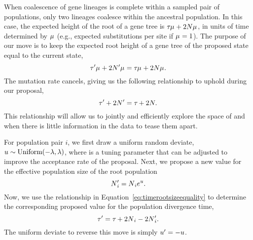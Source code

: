 \begin{linenomath}
When coalescence of gene lineages is complete within a sampled pair of
populations, only two lineages coalesce within the ancestral population.
In this case, the expected height of the root of a gene tree is
$\divtime\murate + 2\sepopsize[\rootpopindex]\murate$,
in units of time determined by $\murate$ (e.g., expected substitutions per site
if $\murate = 1$).
The purpose of our move is to keep the expected root height of a gene tree
of the proposed state equal to the current state,
\begin{equation}
    \divtime\proposed\murate + 2\sepopsize[\rootpopindex]{}\proposed\murate =
    \divtime\murate + 2\sepopsize[\rootpopindex]\murate.
\end{equation}
The mutation rate cancels, giving us the following relationship to uphold
during our proposal,
\begin{equation}
    \divtime\proposed + 2\sepopsize[\rootpopindex]{}\proposed =
    \divtime + 2\sepopsize[\rootpopindex].
    \label{eq:timerootsizeequality}
\end{equation}
This relationship will allow us to jointly and efficiently explore the space of
\divtime and \sepopsize[\rootpopindex] when there is little information in the
data to tease them apart.
\end{linenomath}

\begin{linenomath}
For population pair $i$, we first draw a uniform random deviate,
$\uniformdeviate \sim \textrm{Uniform}(-\tuningparameter, \tuningparameter)$,
where \tuningparameter is a tuning parameter that can be adjusted to 
improve the acceptance rate of the proposal.
Next, we propose a new value for the effective population size of the
root population
\[
    \sepopsize[\rootpopindex]{}_i\proposed = \sepopsize[\rootpopindex]{}_ie^{\uniformdeviate}.
\]
Now, we use the relationship in Equation~\ref{eq:timerootsizeequality} to
determine the corresponding proposed value for the population divergence time,
\begin{equation}
    \divtime\proposed =
    \divtime + 2\sepopsize[\rootpopindex]{}_i - 2\sepopsize[\rootpopindex]{}_i\proposed.
\end{equation}
The uniform deviate to reverse this move is simply
$\uniformdeviate\proposed = -\uniformdeviate$.
\end{linenomath}


